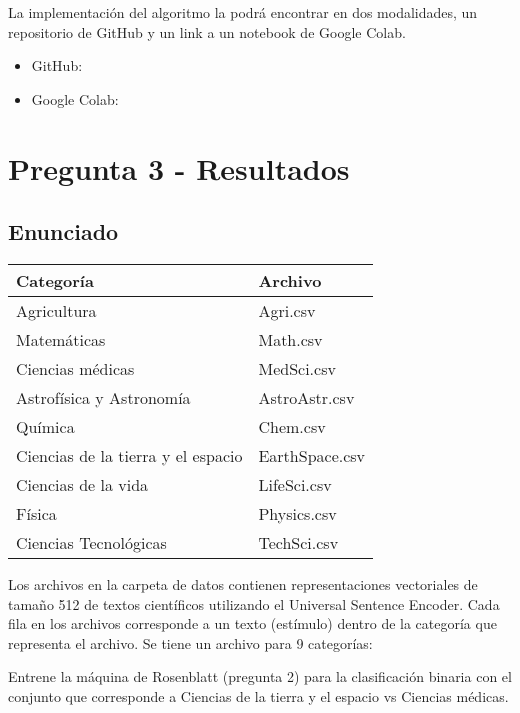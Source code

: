 \documentclass{article}
\theoremstyle{mytheoremstyle}
\theoremstyle{mytheoremstyle}
\theoremstyle{myproblemstyle}
\begin{document}
La implementación del algoritmo la podrá encontrar en dos modalidades, un repositorio de GitHub y un link a un notebook de Google Colab.

\begin{itemize}
  \item GitHub:
  \item Google Colab:
\end{itemize}


\section{Pregunta 3 - Resultados}

\subsection{Enunciado}

\begin{table}[h]
  \centering
  \begin{tabular}{ll}
    \hline
    \textbf{Categoría}                 & \textbf{Archivo} \\
    \hline
    Agricultura                        & Agri.csv         \\
    Matemáticas                        & Math.csv         \\
    Ciencias médicas                   & MedSci.csv       \\
    Astrofísica y Astronomía           & AstroAstr.csv    \\
    Química                            & Chem.csv         \\
    Ciencias de la tierra y el espacio & EarthSpace.csv   \\
    Ciencias de la vida                & LifeSci.csv      \\
    Física                             & Physics.csv      \\
    Ciencias Tecnológicas              & TechSci.csv      \\
    \hline
  \end{tabular}
\end{table}

Los archivos en la carpeta de datos contienen representaciones vectoriales de tamaño 512 de textos científicos utilizando el Universal Sentence Encoder. Cada fila en los archivos corresponde a un texto (estímulo) dentro de la categoría que representa el archivo. Se tiene un archivo para 9 categorías:

Entrene la máquina de Rosenblatt (pregunta 2) para la clasificación binaria con el conjunto que corresponde a Ciencias de la tierra y el espacio vs Ciencias médicas.
\end{document}
